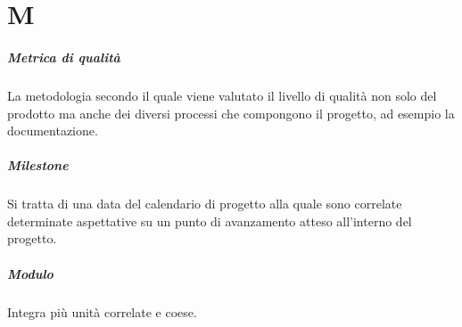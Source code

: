 \chapter{M}
\paragraph{Metrica di qualità}
La metodologia secondo il quale viene valutato il livello di qualità non solo del prodotto ma anche dei diversi processi che compongono il progetto, ad esempio la documentazione.

\paragraph{Milestone}
Si tratta di una data del calendario di progetto alla quale sono correlate determinate aspettative su un punto di avanzamento atteso all'interno del progetto.

\paragraph{Modulo}
Integra più unità correlate e coese.